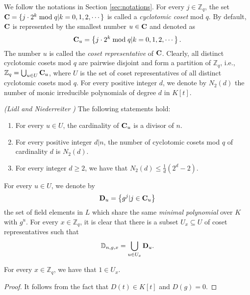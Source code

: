 \documentclass[JMC]{degruyter-journal}
\begin{document}
We follow the notations in Section \ref{sec:notations}. For every
$j\in \mathbb{Z}_q$, the set  ${\bf C}=\{j\cdot 2^k\bmod q|
k=0,1,2,\cdots \}$ is called a {\em cyclotomic coset} mod $q$.   By
default,  ${\bf C}$ is  represented by the smallest  number $u\in
{\bf C}$ and denoted as
\begin{equation*}
{\bf C}_u= \left\{j\cdot 2^k\bmod q| k=0,1,2,\cdots \right\}.
\end{equation*}
The number $u$ is called the {\em coset representative} of ${\bf
C}$. Clearly, all distinct cyclotomic cosets mod $q$ are pairwise
disjoint and form a partition of $\mathbb{Z}_q$, i.e.,
$\mathbb{Z}_q=\bigcup_{u\in U} {\bf C}_u$, where $U$ is the set of
coset representatives of all distinct cyclotomic cosets mod $q$. For
every positive integer $d$, we denote by $N_2(d)$ the  number of
monic irreducible polynomials of degree $d$ in $K[t]$.
\begin{lemma}\label{lem:cyc}
{\em  (Lidl and Niederreiter \cite{LN97})}
The following statements hold:
\begin{enumerate}
\item For every $u\in U$, the cardinality of ${\bf C}_u$ is a divisor of
$n$.
\item For every positive integer $d|n$, the number of cyclotomic cosets
mod $q$ of cardinality $d$ is $N_2(d)$.
\item  For  every integer $d\geq 2$, we have that
$\displaystyle N_2(d)\leq \frac{1}{d}(2^d-2).$
\end{enumerate}
\end{lemma}
For every $u\in U$, we denote by
\begin{equation*}
{\bf D}_u=\left\{g^j| j\in {\bf C}_u\right\}
\end{equation*}
 the set of field elements  in $L$ which share the same {\em minimal polynomial} over $K$ with  $g^u$.
For every $x\in \mathbb{Z}_q$, it is clear that there  is  a subset
$U_x\subseteq U$ of coset representatives such that
\begin{equation}\label{eqn:database_elt}
\mathbb{D}_{n,g,x}=\bigcup_{u\in U_x}{\bf D}_u.
\end{equation}
\begin{lemma}\label{lem:Unotempty}
 For every  $x\in \mathbb{Z}_q$,  we have that $1 \in U_x$.
\end{lemma}


\begin{proof}
It follows from the fact that $D(t)\in K[t]$ and $D(g)=0$.
\end{proof}
\end{document}
